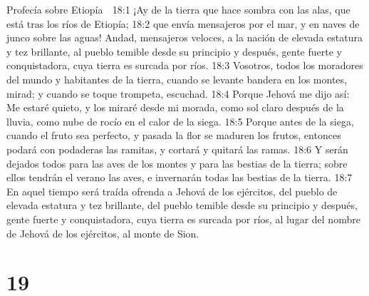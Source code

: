 Profecía sobre Etiopía  

18:1 ¡Ay de la tierra que hace sombra con las alas, que está tras los ríos de Etiopía; 
18:2 que envía mensajeros por el mar, y en naves de junco sobre las aguas! Andad, mensajeros veloces, a la nación de elevada estatura y tez brillante, al pueblo temible desde su principio y después, gente fuerte y conquistadora, cuya tierra es surcada por ríos.  
18:3 Vosotros, todos los moradores del mundo y habitantes de la tierra, cuando se levante bandera en los montes, mirad; y cuando se toque trompeta, escuchad.  
18:4 Porque Jehová me dijo así: Me estaré quieto, y los miraré desde mi morada, como sol claro después de la lluvia, como nube de rocío en el calor de la siega.  
18:5 Porque antes de la siega, cuando el fruto sea perfecto, y pasada la flor se maduren los frutos, entonces podará con podaderas las ramitas, y cortará y quitará las ramas.  
18:6 Y serán dejados todos para las aves de los montes y para las bestias de la tierra; sobre ellos tendrán el verano las aves, e invernarán todas las bestias de la tierra.  
18:7 En aquel tiempo será traída ofrenda a Jehová de los ejércitos, del pueblo de elevada estatura y tez brillante, del pueblo temible desde su principio y después, gente fuerte y conquistadora, cuya tierra es surcada por ríos, al lugar del nombre de Jehová de los ejércitos, al monte de Sion.  

\chapter{19}

